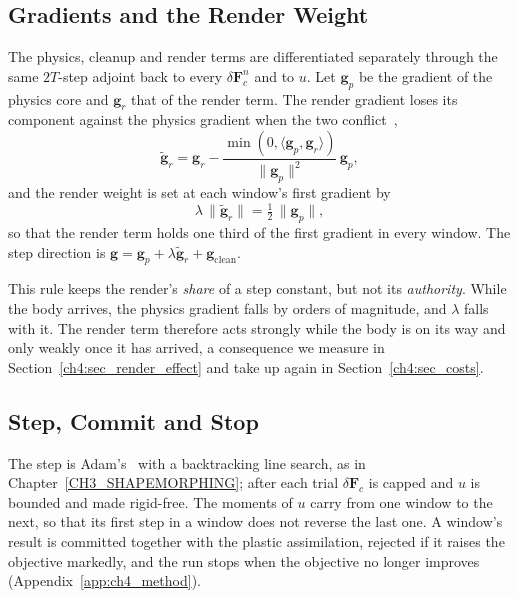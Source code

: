 \subsection{Gradients and the Render Weight}
\label{ch4:sec_lambda}
The physics, cleanup and render terms are differentiated separately through the same $2T$-step adjoint back to every
$\delta\mathbf{F}^n_{c}$ and to $u$. Let $\mathbf{g}_p$ be the gradient of the physics core and $\mathbf{g}_r$ that of the
render term. The render gradient loses its component against the physics gradient when the two
conflict~\citep{yu2020pcgrad},
\begin{equation}
\tilde{\mathbf{g}}_r=\mathbf{g}_r-\frac{\min(0,\langle\mathbf{g}_p,\mathbf{g}_r\rangle)}{\lVert\mathbf{g}_p\rVert^{2}}\,\mathbf{g}_p ,
\end{equation}
and the render weight is set at each window's first gradient by
\begin{equation}
\label{ch4:eq_lambda}
\lambda\,\lVert\tilde{\mathbf{g}}_r\rVert=\tfrac12\,\lVert\mathbf{g}_p\rVert ,
\end{equation}
so that the render term holds one third of the first gradient in every window. The step direction is
$\mathbf{g}=\mathbf{g}_p+\lambda\tilde{\mathbf{g}}_r+\mathbf{g}_{\mathrm{clean}}$.

This rule keeps the render's \emph{share} of a step constant, but not its \emph{authority}. While the body arrives, the
physics gradient falls by orders of magnitude, and $\lambda$ falls with it. The render term therefore acts strongly while
the body is on its way and only weakly once it has arrived, a consequence we measure in
Section~\ref{ch4:sec_render_effect} and take up again in Section~\ref{ch4:sec_costs}.

\subsection{Step, Commit and Stop}
The step is Adam's~\citep{kingma2014adam} with a backtracking line search, as in
Chapter~\ref{CH3_SHAPEMORPHING}; after each trial $\delta\mathbf{F}_c$ is capped and $u$ is bounded and made rigid-free.
The moments of $u$ carry from one window to the next, so that its first step in a window does not reverse the last one.
A window's result is committed together with the plastic assimilation, rejected if it raises the objective markedly, and
the run stops when the objective no longer improves (Appendix~\ref{app:ch4_method}).

